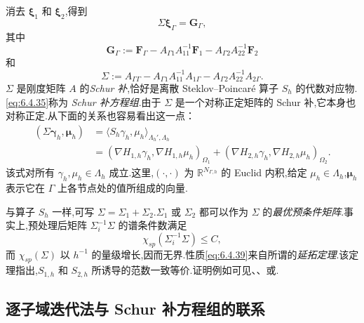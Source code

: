 消去 \(\boldsymbol{\xi}_1\) 和 \(\boldsymbol{\xi}_2\),得到
\begin{equation}\label{eq:6.4.35}
  \Sigma\boldsymbol{\xi}_\Gamma=\boldsymbol{G}_\Gamma,
\end{equation}
其中
\begin{equation}\label{eq:6.4.36}
  \boldsymbol{G}_\Gamma:=\boldsymbol{F}_\Gamma
    -A_{\Gamma1}A_{11}^{-1}\boldsymbol{F}_1
    -A_{\Gamma2}A_{22}^{-1}\boldsymbol{F}_2
\end{equation}
和
\begin{equation}\label{eq:6.4.37}
  \Sigma:=A_{\Gamma\Gamma}-A_{\Gamma1}A_{11}^{-1}A_{1\Gamma}
            -A_{\Gamma2}A_{22}^{-1}A_{2\Gamma}.
\end{equation}
\(\Sigma\) 是刚度矩阵 \(A\) 的\emph{Schur 补},恰好是离散 Steklov--Poincaré 算子 \(S_h\) 的代数对应物.\eqref{eq:6.4.35}称为 \emph{Schur 补方程组}.由于 \(\Sigma\) 是一个对称正定矩阵的 Schur 补,它本身也对称正定.从下面的关系也容易看出这一点：
\begin{equation}\label{eq:6.4.38}
  \begin{aligned}
    (\Sigma\boldsymbol{\gamma}_h,\boldsymbol{\mu}_h)
      &=\langle S_h\gamma_h,\mu_h\rangle_{\Lambda_h',\Lambda_h}\\
      &=(\nabla H_{1,h}\gamma_h,\nabla H_{1,h}\mu_h)_{\Omega_1}
       +(\nabla H_{2,h}\gamma_h,\nabla H_{2,h}\mu_h)_{\Omega_2}.
  \end{aligned}
\end{equation}
该式对所有 \(\gamma_h,\mu_h\in\Lambda_h\) 成立.这里,\((\cdot,\cdot)\) 为 \(\mathbb R^{N_{\Gamma,h}}\) 的 Euclid 内积,给定 \(\mu_h\in\Lambda_h\),\(\boldsymbol{\mu}_h\) 表示它在 \(\Gamma\) 上各节点处的值所组成的向量.

与算子 \(S_h\) 一样,可写 \(\Sigma=\Sigma_1+\Sigma_2\).\(\Sigma_1\) 或 \(\Sigma_2\) 都可以作为 \(\Sigma\) 的\emph{最优预条件矩阵}.事实上,预处理后矩阵 \(\Sigma_i^{-1}\Sigma\) 的谱条件数满足
\begin{equation}\label{eq:6.4.39}
  \chi_{sp}(\Sigma_i^{-1}\Sigma)\le C,
\end{equation}
而 \(\chi_{sp}(\Sigma)\) 以 \(h^{-1}\) 的量级增长,因而无界.性质\eqref{eq:6.4.39}来自所谓的\emph{延拓定理}.该定理指出,\(S_{1,h}\) 和 \(S_{2,h}\) 所诱导的范数一致等价.证明例如可见、、或.

\subsection{逐子域迭代法与 Schur 补方程组的联系}\label{sec:6.4.4}

